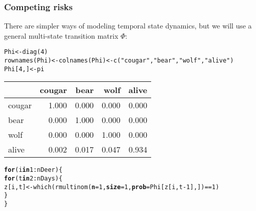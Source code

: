 \documentclass[color=usenames,dvipsnames]{beamer}\usepackage[]{graphicx}\usepackage[]{xcolor}
\makeatletter
\newcommand{\hlnum}[1]{\textcolor[rgb]{0.69,0.494,0}{#1}}%
\newcommand{\hlsng}[1]{\textcolor[rgb]{0.749,0.012,0.012}{#1}}%
\newcommand{\hlopt}[1]{\textcolor[rgb]{0,0,0}{#1}}%
\newcommand{\hldef}[1]{\textcolor[rgb]{0,0,0}{#1}}%
\newcommand{\hlkwa}[1]{\textcolor[rgb]{0,0,0}{\textbf{#1}}}%
\newcommand{\hlkwb}[1]{\textcolor[rgb]{0,0.341,0.682}{#1}}%
\newcommand{\hlkwc}[1]{\textcolor[rgb]{0,0,0}{\textbf{#1}}}%
\newcommand{\hlkwd}[1]{\textcolor[rgb]{0.004,0.004,0.506}{#1}}%
\newenvironment{kframe}{%
 \def\at@end@of@kframe{}%
 \ifinner\ifhmode%
  \def\at@end@of@kframe{\end{minipage}}%
  \begin{minipage}{\columnwidth}%
 \fi\fi%
 \def\FrameCommand##1{\hskip\@totalleftmargin \hskip-\fboxsep
 \colorbox{shadecolor}{##1}\hskip-\fboxsep
     \hskip-\linewidth \hskip-\@totalleftmargin \hskip\columnwidth}%
 \MakeFramed {\advance\hsize-\width
   \@totalleftmargin\z@ \linewidth\hsize
   \@setminipage}}%
 {\par\unskip\endMakeFramed%
 \at@end@of@kframe}
\newenvironment{knitrout}{}{} %
\makeatother
\begin{document}
\begin{frame}[fragile]
  \frametitle{Competing risks}
  There are simpler ways of modeling temporal state dynamics, but we
  will use a general multi-state transition matrix $\Phi$:
\begin{knitrout}\scriptsize
{}\color{fgcolor}\begin{kframe}
\begin{alltt}
\hldef{Phi} \hlkwb{<-} \hlkwd{diag}\hldef{(}\hlnum{4}\hldef{)}
\hlkwd{rownames}\hldef{(Phi)} \hlkwb{<-} \hlkwd{colnames}\hldef{(Phi)} \hlkwb{<-} \hlkwd{c}\hldef{(}\hlsng{"cougar"}\hldef{,} \hlsng{"bear"}\hldef{,} \hlsng{"wolf"}\hldef{,} \hlsng{"alive"}\hldef{)}
\hldef{Phi[}\hlnum{4}\hldef{,]} \hlkwb{<-} \hldef{pi}
\end{alltt}
\end{kframe}
\end{knitrout}
\centering
\begin{tabular}{lrrrr}
\toprule
       & cougar & bear & wolf & alive \\
\midrule
cougar & 1.000      & 0.000 & 0.000 & 0.000  \\
bear   & 0.000      & 1.000 & 0.000 & 0.000  \\
wolf   & 0.000      & 0.000 & 1.000 & 0.000  \\
alive  & 0.002      & 0.017 & 0.047 & 0.934  \\
\bottomrule
\end{tabular}
\pause
\vfill
\begin{knitrout}\scriptsize
{}\color{fgcolor}\begin{kframe}
\begin{alltt}
\hlkwa{for}\hldef{(i} \hlkwa{in} \hlnum{1}\hlopt{:}\hldef{nDeer) \{}
    \hlkwa{for}\hldef{(t} \hlkwa{in} \hlnum{2}\hlopt{:}\hldef{nDays) \{}
        \hldef{z[i,t]} \hlkwb{<-} \hlkwd{which}\hldef{(}\hlkwd{rmultinom}\hldef{(}\hlkwc{n}\hldef{=}\hlnum{1}\hldef{,} \hlkwc{size}\hldef{=}\hlnum{1}\hldef{,} \hlkwc{prob}\hldef{=Phi[z[i,t}\hlopt{-}\hlnum{1}\hldef{],])}\hlopt{==}\hlnum{1}\hldef{)}
    \hldef{\}}
\hldef{\}}
\end{alltt}
\end{kframe}
\end{knitrout}
\end{frame}
\end{document}
